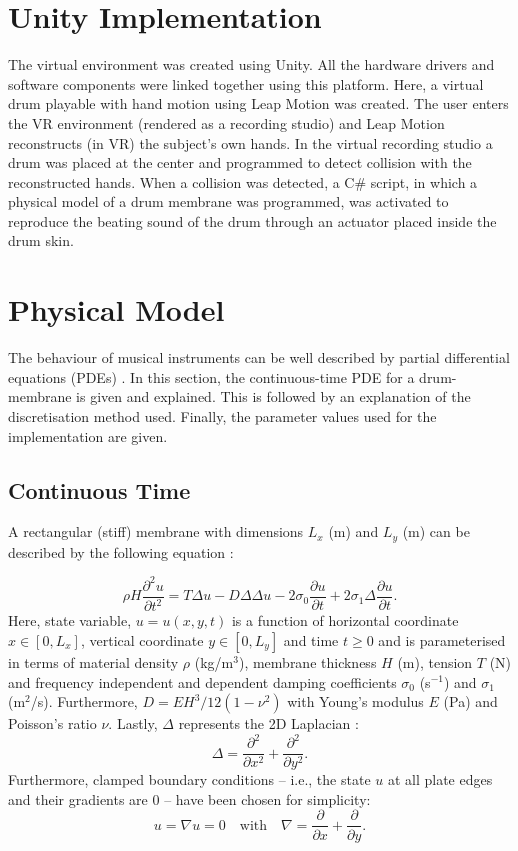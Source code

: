     \section{Unity Implementation}\label{sec:unity}
    The virtual environment was  created using Unity. All the hardware drivers and software components were linked together using this platform. Here, a virtual drum playable with hand motion using Leap Motion was created. The user enters the VR environment (rendered as a recording studio) and Leap Motion reconstructs (in VR) the subject's own hands. In the virtual recording studio a drum was placed at the center and programmed to detect collision with the reconstructed hands. When a collision was detected, a C\# script, in which a physical model of a drum membrane was programmed, was activated to reproduce the beating sound of the drum through an actuator placed inside the drum skin.
    
    \section{Physical Model}\label{sec:PM}
    The behaviour of musical instruments can be well described by partial differential equations (PDEs) \cite{Fletcher1998}. In this section, the continuous-time PDE for a drum-membrane is given and explained. This is followed by an explanation of the discretisation method used. Finally, the parameter values used for the implementation are given. 
    
    \subsection{Continuous Time}
    A rectangular (stiff) membrane with dimensions $L_x$ (m) and $L_y$ (m) can be described by the following equation \cite{bilbao2009numerical}:
    
    \begin{equation}\label{eq:PDE}
    \rho H\frac{\partial^2u}{\partial t^2} = T\Delta u - D\Delta\Delta u - 2 \sigma_0\frac{\partial u}{\partial t} + 2 \sigma_1 \Delta \frac{\partial u}{\partial t}.
    \end{equation}
    Here, state variable, $u = u(x,y,t)$ is a function of horizontal coordinate $x \in [0, L_x]$, vertical coordinate $y \in [0, L_y]$ and time $t\geq0$ and is parameterised in terms of material density $\rho$ (kg/m$^3$), membrane thickness $H$ (m), tension $T$ (N) and frequency independent and dependent damping coefficients $\sigma_0$ (s$^{-1}$) and $\sigma_1$ (m$^2$/s). Furthermore, $D = EH^3/12(1-\nu^2)$ with Young's modulus $E$ (Pa) and Poisson's ratio $\nu$. Lastly, $\Delta$ represents the 2D Laplacian \cite{bilbao2009numerical}:
    \begin{equation}
        \Delta = \frac{\partial^2}{\partial x^2} + \frac{\partial^2}{\partial y^2}.
    \end{equation}
    Furthermore, clamped boundary conditions -- i.e., the state $u$ at all plate edges and their gradients are 0 -- have been chosen for simplicity:
    \begin{equation}
        u = \nabla u = 0 \quad \text{with} \quad \nabla = \frac{\partial}{\partial x} + \frac{\partial}{\partial y}.
    \end{equation}
